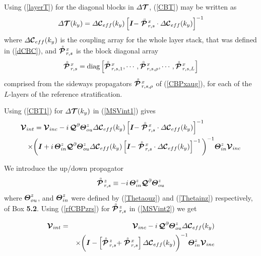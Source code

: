 Using (\ref{layerT}) 
for the diagonal blocks 
 in ${\mit \Delta}{\CB T}$, (\ref{CBT}) may 
be written as
\begin{equation} \label{CBT1}
{\mit \Delta}{\CB T}(k_y)= 
{\mit \Delta}{\CB C}{}_{eff}(k_y)\left[{\bmi I}- 
\rf{\CB P}\!{}^{x}_{r,s}\cdot {\mit \Delta}{\CB 
C}{}_{eff}(k_y)  \right]^{-1}
\end{equation}
where ${\mit \Delta}{\CB C}{}_{eff}(k_y)$ is the coupling array for the 
whole layer stack, that was defined in (\ref{dCBC}), and 
$\rf{\CB P}\!{}^{x}_{r,s}$ is the block diagonal array
\begin{equation} \label{CBPxaugL}
\rf{\CB P}\!{}^{x}_{r,s}=\mbox{diag}\left[
\rf{\CB P}\!{}^{x}_{r,s, 1}, \cdots,
\rf{\CB P}\!{}^{x}_{r,s, \rho}, \cdots,
\rf{\CB P}\!{}^{x}_{r,s, L}
\right]
\end{equation}
comprised from the sideways propagators $\rf{\CB P}\!{}^{x}_{r,s, \rho}$ 
of (\ref{CBPxaug}), for each of the $L$-layers of the 
reference stratification.



Using (\ref{CBT1}) for ${\mit \Delta}{\CB T}(k_y)$ in (\ref{MSVint1}) gives
\begin{eqnarray} \label{MSVint2}
\lefteqn{{\CB  V}_{{int}}
={\CB V}_{{inc}}-i\, {\CB Q}^{\partial} {\bmi \Theta}^{z}_{ou} 
{\mit \Delta}{\CB C}{}_{eff}(k_y) \left[{\bmi I}- \rf{\CB P}\!{}^{x}_{r,s}\cdot {\mit 
\Delta}{\CB C}{}_{eff}(k_y) \right]^{-1}}\nonumber\\ 
&&\times \bigg({\bmi I} + i\, 
 {\bmi \Theta}^{z}_{in} {\CB Q}^{\partial} 
{\bmi \Theta}^{z}_{ou} 
{\mit \Delta}{\CB C}{}_{eff}(k_y) \left[{\bmi I}- \rf{\CB P}\!{}^{x}_{r,s}\cdot {\mit \Delta}{\CB 
C}{}_{eff}(k_y) \right]^{-1} \bigg)^{-1} {\bmi \Theta}^{z}_{in}{\CB 
V}_{{inc}} 
\end{eqnarray}

We introduce the up/down propagator
\begin{equation} \label{rfCBPzrs}
\rf{\CB P}\!{}^{z}_{r,s}\equiv
-i\,{\bmi \Theta}^{z}_{in} {\CB Q}^{\partial} 
{\bmi \Theta}^{z}_{ou}
\end{equation}
where ${\bmi \Theta}^{z}_{ou}$, 
and  ${\bmi \Theta}^{z}_{in}$ were defined by 
(\ref{Thetaouz}) and (\ref{Thetainz}) respectively,  of {\sc Box } {\bf 5.2}.
Using (\ref{rfCBPzrs}) for $\rf{\CB P}\!{}^{z}_{r,s}$ in
 (\ref{MSVint2})  we get
 \begin{samepage}
\begin{eqnarray} \label{MSVint30}
{\CB  V}_{{int}}&=&{\CB  V}_{{inc}}-i\,
{\CB Q}^{\partial}  {\bmi \Theta}^{z}_{ou} 
{\mit \Delta}{\CB C}{}_{eff}(k_y)\nonumber\\
&&\times
\bigg({\bmi I} -  
\left[\rf{\CB P}\!{}^{z}_{r,s}+\rf{\CB P}\!{}^{x}_{r,s}\right]
{\mit \Delta}{\CB C}{}_{eff}(k_y)\bigg)^{-1} 
{\bmi \Theta}^{z}_{in}{\CB  V}_{{inc}}
\end{eqnarray}
\end{samepage}



